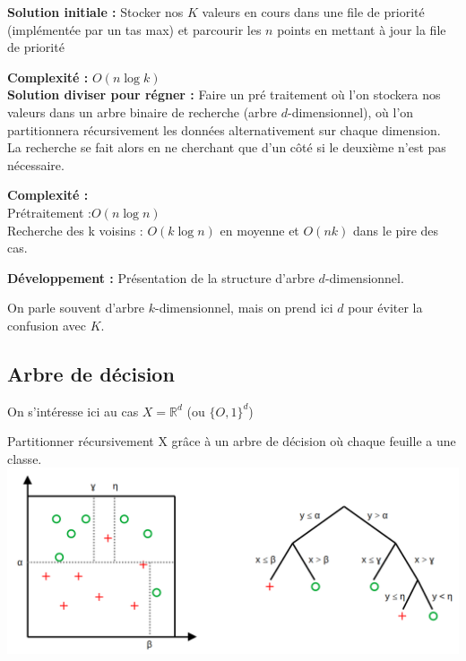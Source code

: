 \begin{impl}\enspace
	
	\textbf{Solution initiale :} Stocker nos $K$ valeurs en cours dans une file de priorité (implémentée par un tas max) et parcourir les $n$ points en mettant à jour la file de priorité
	
	\textbf{Complexité :} $O(n\log k)$\\
	
	\textbf{Solution diviser pour régner :} Faire un pré traitement où l'on stockera nos valeurs dans un arbre binaire de recherche (arbre $d$-dimensionnel), où l'on partitionnera récursivement les données alternativement sur chaque dimension. La recherche se fait alors en ne cherchant que d'un côté si le deuxième n'est pas nécessaire.
	
	\textbf{Complexité :}\\
	Prétraitement :$O(n \log n)$\\
	Recherche des k voisins : $O(k \log n)$ en moyenne et $O(nk)$ dans le pire des cas.
\end{impl}

\noindent \textbf{Développement :} Présentation de la structure d'arbre $d$-dimensionnel.

\begin{rem}
	On parle souvent d'arbre $k$-dimensionnel, mais on prend ici $d$ pour éviter la confusion avec $K$.
\end{rem}

\subsection{Arbre de décision}

On s'intéresse ici au cas $X = \mathbb R^d$ (ou $\{O, 1\}^d$)

\begin{idee}
	Partitionner récursivement X grâce à un arbre de décision où chaque feuille a une classe.\\
	\includegraphics[width=\linewidth]{lecon/15-ml/arb_dec.png}
\end{idee}

